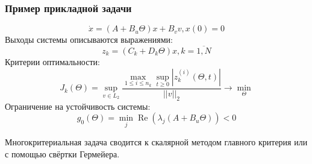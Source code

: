 \documentclass[aspectratio=1610]{beamer}
\DeclareMathOperator{\re}{Re}
\begin{document}
\begin{frame}
  \frametitle{Пример прикладной задачи}

    \begin{displaymath}
      \dot x = (A+B_u\Theta)x + B_v v, x(0)=0
    \end{displaymath}
    Выходы системы описываются выражениями:
    \begin{displaymath}
      z_k=(C_k+D_k\Theta)x,k=\overline{1,N}
    \end{displaymath}
    Критерии оптимальности:
    \begin{displaymath}
      J_k(\Theta)=\sup_{v\in L_2} \frac{\max_{1\leqslant i \leqslant n_k} \sup_{t\geqslant 0}|z_k^{(i)}(\Theta,t)|}{||v||_2} \rightarrow\min_{\Theta}
    \end{displaymath}
    Ограничение на устойчивость системы:
    \begin{displaymath}
      g_0(\Theta)=\min_{j}\re(\lambda_j(A+B_u\Theta)) < 0
    \end{displaymath}

    Многокритериальная задача сводится к скалярной методом главного критерия или с помощью свёртки Гермейера.

\end{frame}
\end{document}
